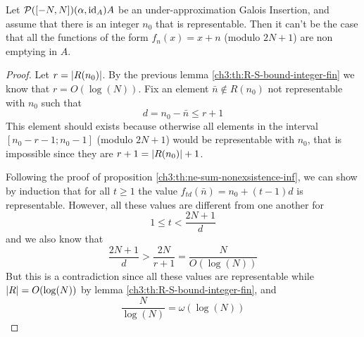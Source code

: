 \begin{prop}\label{ch3:th:ne-sum-nonexsistence-fin}
	Let $\mathcal{P}([-N, N]) (\alpha, \text{id}_A) A$ be an under-approximation Galois Insertion, and assume that there is an integer $n_0$ that is representable. Then it can't be the case that all the functions of the form $f_n(x) = x + n$ (modulo $2N + 1$) are non emptying in $A$.
\end{prop}
\begin{proof}
	Let $r = \lvert R(n_0)\rvert$. By the previous lemma \ref{ch3:th:R-S-bound-integer-fin} we know that $r = O(\log(N))$. Fix an element $\bar{n} \notin R(n_0)$ not representable with $n_0$ such that
	\[
	d = n_0 - \bar{n} \le r + 1
	\]
	This element should exists because otherwise all elements in the interval $[n_0 - r - 1; n_0 - 1]$ (modulo $2N + 1$) would be representable with $n_0$, that is impossible since they are $r + 1 = \lvert R(n_0)\rvert + 1$.

	Following the proof of proposition \ref{ch3:th:ne-sum-nonexsistence-inf}, we can show by induction that for all $t \ge 1$ the value $f_{td}(\bar{n}) = n_0 + (t - 1) d$ is representable. However, all these values are different from one another for
	\[
	1 \le t < \frac{2N + 1}{d}
	\]
	and we also know that
	\[
	\frac{2N + 1}{d} > \frac{2N}{r + 1} = \frac{N}{O(\log(N))}
	\]
	But this is a contradiction since all these values are representable while $\lvert R\rvert = O(\log(N))$ by lemma \ref{ch3:th:R-S-bound-integer-fin}, and
	\[
	\frac{N}{\log(N)} = \omega( \log(N) )
	\]
\end{proof}
